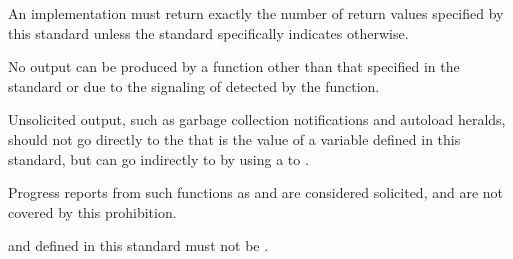 
An implementation must return exactly
the number of return values specified by this standard unless the
standard specifically indicates otherwise.

%


 
No output can be produced by a function other than that specified in
the standard or due to the signaling of 
detected by the function.
 
Unsolicited output, such as garbage collection notifications and
autoload heralds, should not go directly to the 
that is the value of a  variable defined in this
standard, but can go indirectly to  by using a
 to .
 
Progress reports from such functions as  and
 are considered solicited, and are not covered by
this prohibition.

 

%
%

 and  defined in this standard
must not be .

\endlist
